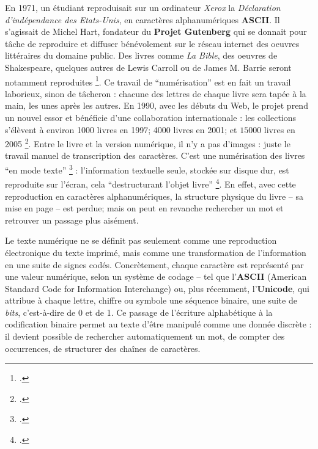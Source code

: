 En 1971, un étudiant reproduisait sur un ordinateur \emph{Xerox} la \emph{Déclaration d'indépendance des Etats-Unis}, en caractères alphanumériques \textbf{ASCII}. Il s'agissait de Michel Hart, fondateur du \textbf{Projet Gutenberg} qui se donnait pour tâche de reproduire et diffuser bénévolement sur le réseau internet des oeuvres littéraires du domaine public. Des livres comme \emph{La Bible}, des oeuvres de Shakespeare, quelques autres de Lewis Carroll ou de James M. Barrie seront notamment reproduites \footcite[][]{lebert}. Ce travail de \enquote{numérisation} est en fait un travail laborieux, sinon de tâcheron : chacune des lettres de chaque livre sera tapée à la main, les unes après les autres. En 1990, avec les débuts du Web, le projet prend un nouvel essor et bénéficie d'une collaboration internationale : les collections s'élèvent à environ 1000 livres en 1997; 4000 livres en 2001; et $15000$ livres en 2005 \footcite[][]{lebert}. Entre le livre et la version numérique, il n'y a pas d'images : juste le travail manuel de transcription des caractères. C'est une numérisation des livres \enquote{en mode texte} \footcite[][30-33]{bermesbook} : l'information textuelle seule, stockée sur disque dur, est reproduite sur l'écran, cela \enquote{destructurant l'objet livre} \footcite[][]{bermesbook}. En effet, avec cette reproduction en caractères alphanumériques, la structure physique du livre -- sa mise en page -- est perdue; mais on peut en revanche rechercher un mot et retrouver un passage plus aisément. 

Le texte numérique ne se définit pas seulement comme une reproduction électronique du texte imprimé, mais comme une transformation de l’information en une suite de signes codés. Concrètement, chaque caractère est représenté par une valeur numérique, selon un système de codage -- tel que l’\textbf{ASCII} (American Standard Code for Information Interchange) ou, plus récemment, l’\textbf{Unicode}, qui attribue à chaque lettre, chiffre ou symbole une séquence binaire, une suite de \emph{bits}, c’est-à-dire de 0 et de 1. Ce passage de l’écriture alphabétique à la codification binaire permet au texte d’être manipulé comme une donnée discrète : il devient possible de rechercher automatiquement un mot, de compter des occurrences, de structurer des chaînes de caractères.

